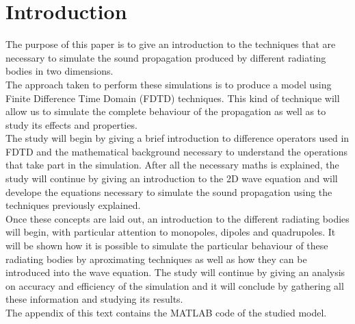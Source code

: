 
%
%
%


\chapter{Introduction}
\label{chapter1}

The purpose of this paper is to give an introduction to the techniques that are necessary to simulate the sound propagation produced by different radiating bodies in two dimensions.\\
The approach taken to perform these simulations is to produce a model using Finite Difference Time Domain (FDTD) techniques. This kind of technique will allow us to simulate the complete behaviour of the propagation as well as to study its effects and properties.\\
The study will begin by giving a brief introduction to difference operators used in FDTD and the mathematical background necessary to understand the operations that take part in the simulation.
After all the necessary maths is explained, the study will continue by giving an introduction to the 2D wave equation and will develope the equations necessary to simulate the sound propagation using the techniques previously explained.\\
Once these concepts are laid out, an introduction to the different radiating bodies will begin, with particular attention to monopoles, dipoles and quadrupoles. It will be shown how it is possible to simulate the particular behaviour of these radiating bodies by aproximating techniques as well as how they can be introduced into the wave equation.
The study will continue by giving an analysis on accuracy and efficiency of the simulation and it will conclude by gathering all these information and studying its results.\\
The appendix of this text contains the MATLAB code of the studied model.
